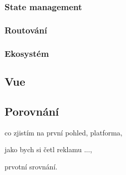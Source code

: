 \subsubsection{State management}
\subsubsection{Routování}
\subsubsection{Ekosystém}

\subsection{Vue}

\subsection{Porovnání}

\begin{citemize}
	\item co zjistím na první pohled, platforma,
	\item jako bych si četl reklamu ...,
	\item prvotní srovnání.
\end{citemize}
